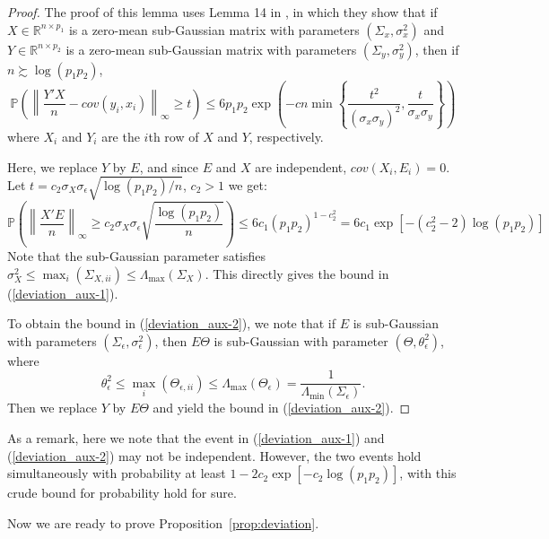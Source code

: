 \begin{proof}
The proof of this lemma uses Lemma 14 in \citet{loh2011high}, in which they show that if $X\in\mathbb{R}^{n\times p_1}$ is a zero-mean sub-Gaussian matrix with parameters $(\Sigma_x,\sigma_x^2)$ and $Y\in\mathbb{R}^{n\times p_2}$ is a zero-mean sub-Gaussian matrix with parameters $(\Sigma_y,\sigma_y^2)$, then if $n\succsim \log(p_1p_2)$, 
\begin{equation*}
\mathbb{P}\left(\left\| \frac{Y'X}{n} - cov(y_i,x_i)\right\|_\infty \geq t \right) \leq 6p_1p_2\exp\left(-cn\min\left\{\frac{t^2}{(\sigma_x\sigma_y)^2},\frac{t}{\sigma_x\sigma_y} \right\} \right)
\end{equation*}
where $X_i$ and $Y_i$ are the $i$th row of $X$ and $Y$, respectively. 


Here, we replace $Y$ by $E$, and since $E$ and $X$ are independent, $cov(X_i,E_i)=0$. Let $t=c_2\sigma_X\sigma_\epsilon\sqrt{\log(p_1p_2)/n}$, $c_2>1$ we get:
\begin{equation*}
\mathbb{P}\left(\left\| \frac{X'E}{n}\right\|_\infty\geq c_2\sigma_X\sigma_\epsilon\sqrt{\frac{\log(p_1p_2)}{n}} \right)\leq 6c_1(p_1p_2)^{1-c_2^2} = 6c_1\exp\left[-(c_2^2-2)\log(p_1p_2)\right]
\end{equation*}
Note that the sub-Gaussian parameter satisfies $\sigma^2_X\leq \max_i(\Sigma_{X,ii})\leq \Lambda_{\max}(\Sigma_X)$. This directly gives the bound in (\ref{deviation_aux-1}). 


To obtain the bound in (\ref{deviation_aux-2}), we note that if $E$ is sub-Gaussian with parameters $(\Sigma_\epsilon,\sigma_\epsilon^2)$, then $E\Theta$ is sub-Gaussian with parameter $(\Theta,\theta_\epsilon^2)$, where
\begin{equation*}
\theta_\epsilon^2 \leq \max_i(\Theta_{\epsilon,ii}) \leq \Lambda_{\max}(\Theta_\epsilon) = \frac{1}{\Lambda_{\min}(\Sigma_\epsilon)}.
\end{equation*}
Then we replace $Y$ by $E\Theta$ and yield the bound in (\ref{deviation_aux-2}).
\end{proof}

As a remark, here we note that the event in (\ref{deviation_aux-1}) and (\ref{deviation_aux-2}) may not be independent. However, the two events hold simultaneously with probability at least $1-2c_2\exp[-c_2\log(p_1p_2)]$, with this crude bound for probability hold for sure. 

\medskip
Now we are ready to prove Proposition~\ref{prop:deviation}. 

